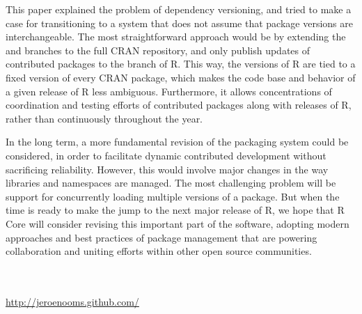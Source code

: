 This paper explained the problem of dependency versioning, and tried to make
a case for transitioning to a system that does not assume that package versions
are interchangeable. The most straightforward approach would be by extending
the  and  branches to the full CRAN repository, and
only publish updates of contributed packages to the 
branch of R. This way, the  versions of R are tied to a fixed
version of every CRAN package, which makes the code base and behavior of a
given release of R less ambiguous. Furthermore, it allows concentrations of
coordination and testing efforts of contributed packages along with releases of
R, rather than continuously throughout the year.

In the long term, a more fundamental revision of the packaging system could be
considered, in order to facilitate dynamic contributed development without
sacrificing reliability. However, this would involve major changes in the way
libraries and namespaces are managed. The most challenging problem will be
support for concurrently loading multiple versions of a package. 
But when the time is ready to make the jump to the next major release of R, we
hope that R Core will consider revising this important part of the software,
adopting modern approaches and best practices of package management that are
powering collaboration and uniting efforts within other open source communities.



\address{Jeroen Ooms\\
  Department of Statistics\\
  University of California\\
  Los Angeles}\\
 \\
\url{http://jeroenooms.github.com/}

